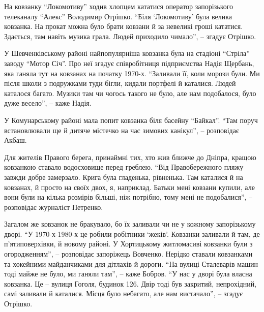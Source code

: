 На ковзанку \enquote{Локомотиву} ходив хлопцем кататися оператор запорізького
телеканалу \enquote{Алекс} Володимир Отрішко. \enquote{Біля \enquote{Локомотиву} була велика ковзанка.
На прокат можна було брати ковзани й за невеликі гроші кататися. Здається, там
навіть музика грала. Людей приходило чимало}, – згадує Отрішко.

У Шевченківському районі найпопулярніша ковзанка була на стадіоні \enquote{Стріла}
заводу \enquote{Мотор Січ}. Про неї згадує співробітниця підприємства Надія Щербань,
яка ганяла тут на ковзанах на початку 1970-х. \enquote{Заливали її, коли морози були.
Ми після школи з подружками туди бігли, кидали портфелі й каталися. Людей
каталося багато. Музики там чи чогось такого не було, але нам подобалося, було
дуже весело}, – каже Надія.

У Комунарському районі мала попит ковзанка біля басейну \enquote{Байкал}. \enquote{Там поруч
встановлювали ще й дитяче містечко на час зимових канікул}, – розповідає Акбаш.

Для жителів Правого берега, принаймні тих, хто жив ближче до Дніпра, кращою
ковзанкою ставало водосховище перед греблею. \enquote{Від Правобережного пляжу
завжди добре замерзало. Крига була гладенька, рівненька. Там каталися й на
ковзанах, й просто на своїх двох, я, наприклад. Батьки мені ковзани купили, але
вони були на кілька розмірів більші, ніж потрібно, тому мені не подобалися}, –
розповідає журналіст Петренко.

Загалом же ковзанок не бракувало, бо їх заливали чи не у кожному запорізькому
дворі. \enquote{У 1970-х-1980-х це робили робітники \enquote{жеків}. Ковзанки
заливали й там, де п’ятиповерхівки, й новому районі. У Хортицькому житломасиві
ковзанки були з огородженням}, – розповідає запоріжець Вовченко. Нерідко
ставали ковзанками та хокейними майданчиками для дітлахів й дороги. \enquote{На
вулиці Сталеварів машин тоді майже не було, ми ганяли там}, – каже Бобров.
\enquote{У нас у дворі була власна ковзанка. Це – вулиця Гоголя, будинок 126.
Двір тоді був закритий, непрохідний, самі заливали й каталися. Місця було
небагато, але нам вистачало}, – згадує Отрішко.
